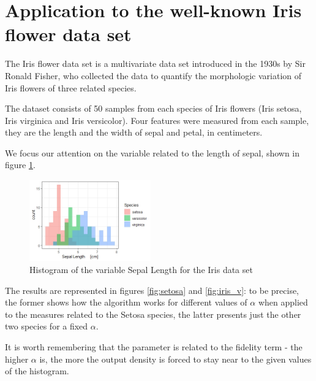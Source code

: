 \section{Application to the well-known Iris flower data set}
The Iris flower data set is a multivariate data set introduced in the 1930s by Sir Ronald Fisher, who collected the data to quantify the morphologic variation of Iris flowers of three related species.
 
The dataset consists of 50 samples from each species of Iris flowers (Iris setosa, Iris virginica and Iris versicolor). Four features were measured from each sample, they are the length and the width of sepal and petal, in centimeters. 

We focus our attention on the variable related to the length of sepal, shown in figure \ref{fig:iris}.

\begin{figure}
	\includegraphics[height=3.5cm]{./pictures/iris/iris.jpeg}
	\centering
	\caption{Histogram of the variable Sepal Length for the Iris data set}
	\label{fig:iris}	
\end{figure}

The results are represented in figures \ref{fig:setosa} and \ref{fig:iris_v}: to be precise, the former shows how the algorithm works for different values of $\alpha$ when applied to the measures related to the Setosa species, the latter presents just the other two species for a fixed $\alpha$. 

It is worth remembering that the parameter is related to the fidelity term - the higher $\alpha$ is, the more the output density is forced to stay near to the given values of the histogram.

